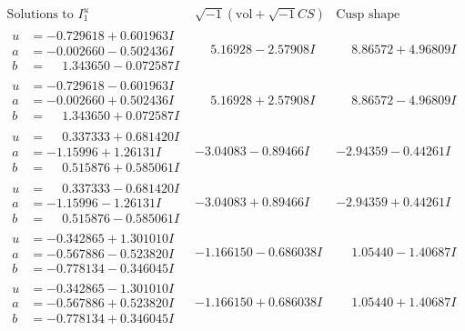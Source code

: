 \documentclass[1p]{elsarticle_modified}
\theoremstyle{definition}
\newcommand{\I}{\sqrt{-1}}
\begin{document}
$$\begin{array}{c|c|c}  
\text{Solutions to }I^u_{1}& \I (\text{vol} + \sqrt{-1}CS) & \text{Cusp shape}\\
 \hline 
\begin{aligned}
u &= -0.729618 + 0.601963 I \\
a &= -0.002660 - 0.502436 I \\
b &= \phantom{-}1.343650 - 0.072587 I\end{aligned}
 & \phantom{-}5.16928 - 2.57908 I & \phantom{-}8.86572 + 4.96809 I \\ \hline\begin{aligned}
u &= -0.729618 - 0.601963 I \\
a &= -0.002660 + 0.502436 I \\
b &= \phantom{-}1.343650 + 0.072587 I\end{aligned}
 & \phantom{-}5.16928 + 2.57908 I & \phantom{-}8.86572 - 4.96809 I \\ \hline\begin{aligned}
u &= \phantom{-}0.337333 + 0.681420 I \\
a &= -1.15996 + 1.26131 I \\
b &= \phantom{-}0.515876 + 0.585061 I\end{aligned}
 & -3.04083 - 0.89466 I & -2.94359 - 0.44261 I \\ \hline\begin{aligned}
u &= \phantom{-}0.337333 - 0.681420 I \\
a &= -1.15996 - 1.26131 I \\
b &= \phantom{-}0.515876 - 0.585061 I\end{aligned}
 & -3.04083 + 0.89466 I & -2.94359 + 0.44261 I \\ \hline\begin{aligned}
u &= -0.342865 + 1.301010 I \\
a &= -0.567886 - 0.523820 I \\
b &= -0.778134 - 0.346045 I\end{aligned}
 & -1.166150 - 0.686038 I & \phantom{-}1.05440 - 1.40687 I \\ \hline\begin{aligned}
u &= -0.342865 - 1.301010 I \\
a &= -0.567886 + 0.523820 I \\
b &= -0.778134 + 0.346045 I\end{aligned}
 & -1.166150 + 0.686038 I & \phantom{-}1.05440 + 1.40687 I \\ \hline\begin{aligned}

\end{aligned}
\end{array}$$
\end{document}
